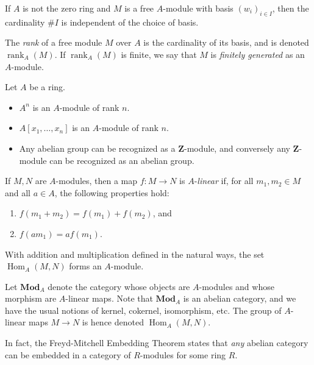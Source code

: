 \documentclass[11pt,openany]{book} %
\newcommand{\Z}{\mathbf{Z}}
\begin{document}
\begin{lemma}
If $A$ is not the zero ring and $M$ is a free $A$-module with basis $(w_i)_{i \in I}$, then the cardinality $\#I$ is independent of the choice of basis.
\end{lemma}

\begin{definition}
The \emph{rank} of a free module $M$ over $A$ is the cardinality of its basis, and is denoted $\operatorname{rank}_A(M)$. If $\operatorname{rank}_A(M)$ is finite, we say that $M$ is \emph{finitely generated} as an $A$-module.
\end{definition}

\begin{example}
Let $A$ be a ring.
\begin{itemize}
	\item $A^n$ is an $A$-module of rank $n$.
    \item $A[x_1,\ldots,x_n]$ is an $A$-module of rank $n$.
    \item Any abelian group can be recognized as a $\Z$-module, and conversely any $\Z$-module can be recognized as an abelian group.
\end{itemize}
\end{example}

\begin{definition}
If $M,N$ are $A$-modules, then a map $f : M \to N$ is $A$-\emph{linear} if, for all $m_1,m_2 \in M$ and all $a \in A$, the following properties hold:
\begin{enumerate}
	\item $f(m_1 + m_2) = f(m_1) + f(m_2)$, and
    \item $f(am_1) = af(m_1)$.
\end{enumerate}
\end{definition}

\begin{lemma}
With addition and multiplication defined in the natural ways, the set $\operatorname{Hom}_A(M,N)$ forms an $A$-module.
\end{lemma}

\medskip
Let $\mathbf{Mod}_A$ denote the category whose objects are $A$-modules and whose morphism are $A$-linear maps. Note that $\mathbf{Mod}_A$ is an abelian category, and we have the usual notions of kernel, cokernel, isomorphism, etc. The group of $A$-linear maps $M \to N$ is hence denoted $\operatorname{Hom}_A(M,N)$.

\begin{remark}
In fact, the Freyd-Mitchell Embedding Theorem states that \emph{any} abelian category can be embedded in a category of $R$-modules for some ring $R$.
\end{remark}
\end{document}
